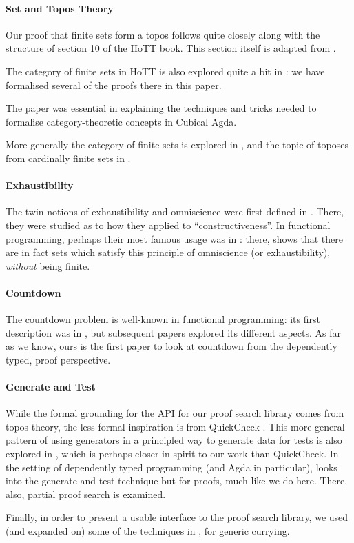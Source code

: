 \paragraph{Set and Topos Theory}
Our proof that finite sets form a topos follows quite closely along with the
structure of section 10 of the HoTT book.
This section itself is adapted from \cite{rijkeSetsHomotopyType2015}.

The category of finite sets in HoTT is also explored quite a bit in
\cite{yorgeyCombinatorialSpeciesLabelled2014}: we have formalised several of
the proofs there in this paper.

The paper \cite{iversenUnivalentCategoriesFormalization2018} was essential in
explaining the techniques and tricks needed to formalise category-theoretic
concepts in Cubical Agda.

More generally the category of finite sets is explored in
\cite{solovevCategoryFiniteSets1983}, and the topic of toposes from cardinally
finite sets in \cite{henryToposesGeneratedCardinal2018}.
\paragraph{Exhaustibility}
The twin notions of exhaustibility and omniscience were first defined in
\cite{bishopFoundationsConstructiveAnalysis1967}.
There, they were studied as to how they applied to ``constructiveness''.
In functional programming, perhaps their most famous usage was in
\cite{escardoInfiniteSetsThat2013}: there,
\citeauthor{escardoInfiniteSetsThat2013} shows that there are in fact sets which
satisfy this principle of omniscience (or exhaustibility), \emph{without} being
finite.
\paragraph{Countdown}
The countdown problem is well-known in functional programming: its first
description was in \cite{huttonCountdownProblem2002}, but subsequent papers
\cite{birdCountdownCaseStudy2005, birdFunctionalPearlTrouble2003}
explored its different aspects.
As far as we know, ours is the first paper to look at countdown from the
dependently typed, proof perspective.
\paragraph{Generate and Test}
While the formal grounding for the API for our proof search library comes from
topos theory, the less formal inspiration is from QuickCheck
\cite{claessenQuickCheckLightweightTool2011}.
This more general pattern of using generators in a principled way to generate
data for tests is also explored in \cite{runcimanSmallCheckLazySmallCheck2008},
which is perhaps closer in spirit to our work than QuickCheck.
In the setting of dependently typed programming (and Agda in particular),
\cite{oconnorApplicationsApplicativeProof2016} looks into the generate-and-test
technique but for proofs, much like we do here.
There, also, partial proof search is examined.

Finally, in order to present a usable interface to the proof search library, we
used (and expanded on) some of the techniques in
\cite{allaisGenericLevelPolymorphic2019}, for generic currying.

